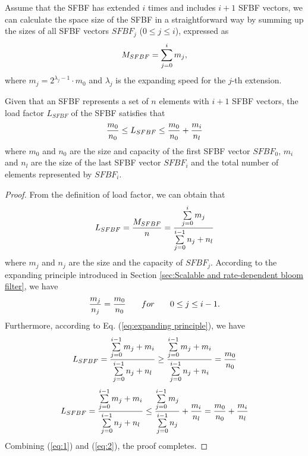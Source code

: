 \documentclass[10pt,journal,compsoc]{IEEEtran}
\newtheorem{proof}{Proof}
\begin{document}
Assume that the SFBF has extended $i$ times and includes $i+1$ SFBF vectors, we can calculate the space size of the SFBF in a straightforward way by summing up the sizes of all SFBF vectors $SFBF_j$ ($0 \le j \le i$), expressed as
\begin{equation}
\footnotesize
{M_{SFBF}} = \sum\limits_{j = 0}^i {{m_j}},
\end{equation}
where ${m_j} = {2^{{\lambda _j} -1 }} \cdot {m_0}$ and  $\lambda _j$ is the expanding speed for the $j$-th extension.
\begin{theorem}
\label{th:Load factor}
Given that an SFBF represents a set of $n$ elements with $i+1$ SFBF vectors, the load factor $L_{SFBF}$ of the SFBF satisfies that
\begin{equation}
\footnotesize
\frac{{{m_0}}}{{{n_0}}} \le {L_{SFBF}} \le \frac{{{m_0}}}{{{n_0}}} + \frac{{{m_i}}}{n_{l}}
\end{equation}
where  $m_0$ and $n_0$ are the size and capacity of the first SFBF vector $SFBF_0$,  $m_i$ and $n_{l}$ are the size of the last SFBF vector $SFBF_i$ and the total number of elements represented by $SFBF_i$.
\end{theorem}
\begin{proof}
From the definition of load factor, we can obtain that
\begin{equation}
\footnotesize
{L_{SFBF}} = \frac{{{M_{SFBF}}}}{n} = \frac{{\sum\limits_{j = 0}^i {{m_j}} }}{{\sum\limits_{j = 0}^{i - 1} {{n_j} + n_l} }}
\end{equation}
where $m_j$ and $n_j$ are the size and the capacity of $SFBF_j$.
According to the expanding principle introduced in Section \ref{sec:Scalable and rate-dependent bloom filter}, we have
\begin{equation}
\footnotesize
\frac{{{m_j}}}{{{n_j}}} = \frac{{{m_0}}}{{{n_0}}} \qquad  for  \qquad  0 \le j \le i - 1.
\label{eq:expanding principle}
\end{equation}
Furthermore, according to Eq. (\ref{eq:expanding principle}), we have
\begin{equation}
\footnotesize
{L_{SFBF}} = \frac{{\sum\limits_{j = 0}^{i - 1} {{m_j} + {m_i}} }}{{\sum\limits_{j = 0}^{i - 1} {{n_j} + n_{l}} }} \ge \frac{{\sum\limits_{j = 0}^{i - 1} {{m_j} + {m_i}} }}{{\sum\limits_{j = 0}^{i - 1} {{n_j} + {n_i}} }} = \frac{{{m_0}}}{{{n_0}}}
\label{eq:1}
\end{equation}
\begin{equation}
\footnotesize
{L_{SFBF}} = \frac{{\sum\limits_{j = 0}^{i - 1} {{m_j} + {m_i}} }}{{\sum\limits_{j = 0}^{i - 1} {{n_j} + n_{l}} }} \le \frac{{\sum\limits_{j = 0}^{i - 1} {{m_j}} }}{{\sum\limits_{j = 0}^{i - 1} {{n_j}} }} + \frac{{{m_i}}}{n_{l}} = \frac{{{m_0}}}{{{n_0}}} + \frac{{{m_i}}}{n_{l}}
\label{eq:2}
\end{equation}
Combining (\ref{eq:1}) and (\ref{eq:2}), the proof completes.
\end{proof}
\end{document}
